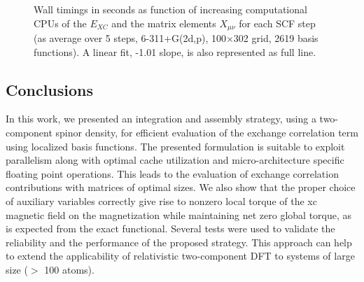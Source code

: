 \begin{figure}
\begin{center}
\end{center}
\caption{
Wall timings in seconds as function of increasing computational CPUs of the $E_{XC}$ and the matrix 
elements $X_{\mu \nu}$ for each SCF step (as average over 5 steps, 6-311+G(2d,p), 100$\times$302 grid, 
2619 basis functions). A linear fit, -1.01 slope, is also represented as full line.
}
\label{fig:nodes}       
\end{figure}

\subsection{Conclusions}
In this work, we presented an integration and assembly strategy, 
using a two-component spinor density, for efficient evaluation
of the exchange correlation term using localized basis
functions. 
The presented formulation is suitable to exploit parallelism 
along with optimal cache utilization and micro-architecture specific floating point operations.
This leads to the evaluation of exchange correlation
contributions with matrices of optimal sizes. 
We also show that the proper choice of auxiliary variables 
correctly give rise to nonzero local torque of the xc magnetic field on the magnetization
while maintaining net zero global torque, as is expected from
the exact functional. 
Several tests were used to validate 
the reliability and the performance of the proposed strategy.
This approach can help to extend 
the applicability of relativistic two-component DFT 
to systems of large size ($>$ 100 atoms). 







